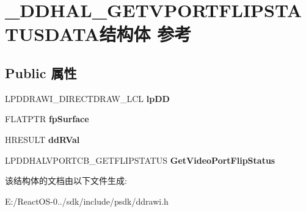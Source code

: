 \hypertarget{struct___d_d_h_a_l___g_e_t_v_p_o_r_t_f_l_i_p_s_t_a_t_u_s_d_a_t_a}{}\section{\+\_\+\+D\+D\+H\+A\+L\+\_\+\+G\+E\+T\+V\+P\+O\+R\+T\+F\+L\+I\+P\+S\+T\+A\+T\+U\+S\+D\+A\+T\+A结构体 参考}
\label{struct___d_d_h_a_l___g_e_t_v_p_o_r_t_f_l_i_p_s_t_a_t_u_s_d_a_t_a}
\subsection*{Public 属性}
\begin{DoxyCompactItemize}
\item 
\mbox{\label{struct___d_d_h_a_l___g_e_t_v_p_o_r_t_f_l_i_p_s_t_a_t_u_s_d_a_t_a_a606c5a8d93a943840f45424d02f6fc84}} 
L\+P\+D\+D\+R\+A\+W\+I\+\_\+\+D\+I\+R\+E\+C\+T\+D\+R\+A\+W\+\_\+\+L\+CL {\bfseries lp\+DD}
\item 
\mbox{\label{struct___d_d_h_a_l___g_e_t_v_p_o_r_t_f_l_i_p_s_t_a_t_u_s_d_a_t_a_aaa85d5ead70f4d2c111cd42b55a2ebfa}} 
F\+L\+A\+T\+P\+TR {\bfseries fp\+Surface}
\item 
\mbox{\label{struct___d_d_h_a_l___g_e_t_v_p_o_r_t_f_l_i_p_s_t_a_t_u_s_d_a_t_a_a7ca2d05b90ba01be08f1d499d6595d0c}} 
H\+R\+E\+S\+U\+LT {\bfseries dd\+R\+Val}
\item 
\mbox{\label{struct___d_d_h_a_l___g_e_t_v_p_o_r_t_f_l_i_p_s_t_a_t_u_s_d_a_t_a_aa6633d3f230e39b952f377cf3ed3218e}} 
L\+P\+D\+D\+H\+A\+L\+V\+P\+O\+R\+T\+C\+B\+\_\+\+G\+E\+T\+F\+L\+I\+P\+S\+T\+A\+T\+US {\bfseries Get\+Video\+Port\+Flip\+Status}
\end{DoxyCompactItemize}


该结构体的文档由以下文件生成\+:\begin{DoxyCompactItemize}
\item 
E\+:/\+React\+O\+S-\/0../sdk/include/psdk/ddrawi.\+h\end{DoxyCompactItemize}
